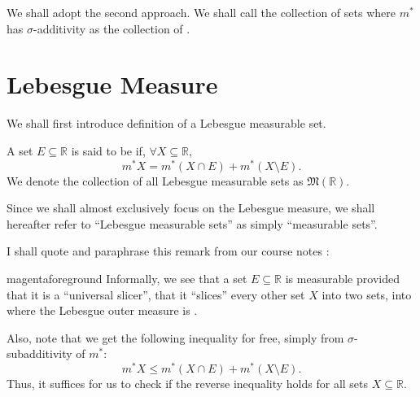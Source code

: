 \documentclass[notoc,notitlepage]{tufte-book}
\begin{document}
We shall adopt the second approach. We shall call the collection of sets where
$m^*$ has $\sigma$-additivity as the collection of .


\section{Lebesgue Measure}%
\label{sec:lebesgue_measure}

We shall first introduce  definition of a Lebesgue
measurable set.

\begin{defn}\label{defn:lebesgue_measureable_set}
  A set $E \subseteq \mathbb{R}$ is said to be  if,
  $\forall X \subseteq \mathbb{R}$,
  \begin{equation*}
    m^* X = m^* ( X \cap E ) + m^* (X \setminus E).
  \end{equation*}
  We denote the collection of all Lebesgue measurable sets as
  $\mathfrak{M}(\mathbb{R})$.
\end{defn}

\begin{remark}
  Since we shall almost exclusively focus on the Lebesgue measure, we shall
  hereafter refer to ``Lebesgue measurable sets'' as simply ``measurable sets''.
\end{remark}

\begin{note}
  I shall quote and paraphrase this remark from our course notes
  \cite{marcoux2018}:
  \begin{quotebox}{magenta}{foreground}
    Informally, we see that a set $E \subseteq \mathbb{R}$ is measurable
    provided that it is a ``universal slicer'', that it ``slices'' every other
    set $X$ into two  sets, into where the Lebesgue outer
    measure is .
  \end{quotebox}

  Also, note that we get the following inequality for free, simply from
  $\sigma$-subadditivity of $m^*$:
  \begin{equation*}
    m^* X \leq m^* (X \cap E) + m^* (X \setminus E).
  \end{equation*}
  Thus, it suffices for us to check if the reverse inequality holds for all sets
  $X \subseteq \mathbb{R}$.
\end{note}
\end{document}
